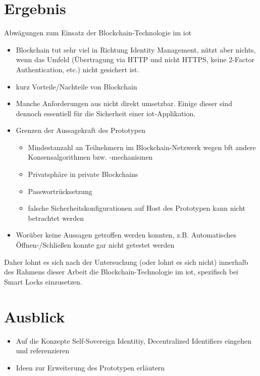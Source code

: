 \section{Ergebnis}
\label{sec:end}
    Abwägungen zum Einsatz der Blockchain-Technologie im \gls{iot}
    \begin{itemize}[noitemsep]
        \item Blockchain tut sehr viel in Richtung Identity Management, nützt aber nichts, wenn das Umfeld (Übertragung via HTTP und nicht HTTPS, keine 2-Factor Authentication, etc.) nicht gesichert ist.
        \item kurz Vorteile/Nachteile von Blockchain
        \item Manche Anforderungen aus  nicht direkt umsetzbar.
            Einige dieser sind dennoch essentiell für die Sicherheit einer \gls{iot}-Applikation.
        \item Grenzen der Aussagekraft des Prototypen
		    \begin{itemize}[noitemsep]
		        \item Mindestanzahl an Teilnehmern im Blockchain-Netzwerk wegen \gls{bft} \textrightarrow andere Konsensalgorithmen bzw. -mechanismen
		        \item Privatsphäre in private Blockchains
		        \item Passwortrücksetzung
		        \item falsche Sicherheitskonfigurationen auf Host des Prototypen kann nicht betrachtet werden
		    \end{itemize}
		\item Worüber keine Aussagen getroffen werden konnten, z.B. Automatisches Öffnen-/\-Schließen konnte gar nicht getestet werden
    \end{itemize}
    Daher lohnt es sich nach der Untersuchung (oder lohnt es sich nicht) innerhalb des Rahmens dieser Arbeit die Blockchain-Technologie im \gls{iot}, spezifisch bei Smart Locks einzusetzen.
    
    
\section{Ausblick}
\label{sec:end_further}
	\begin{itemize}[noitemsep]
		\item Auf die Konzepte Self-Sovereign Identitiy, Decentralized Identifiers eingehen und referenzieren
		\item Ideen zur Erweiterung des Prototypen erläutern
	\end{itemize}
